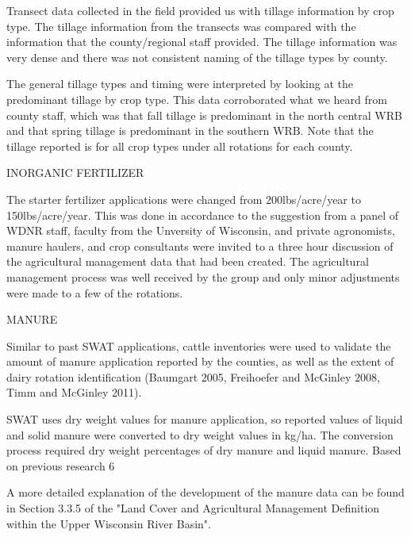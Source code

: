 Transect data collected in the field provided us with tillage information by crop type. The tillage information from the transects was compared with the information that the county/regional staff provided. The tillage information was very dense and there was not consistent naming of the tillage types by county.

The general tillage types and timing were interpreted by looking at the predominant tillage by
crop type. This data corroborated what we heard from county staff, which was that
fall tillage is predominant in the north central WRB and that spring tillage is predominant in the
southern WRB. Note that the tillage reported is for all crop types under all rotations for each county. 

INORGANIC FERTILIZER

The starter fertilizer applications were changed from 200lbs/acre/year to 150lbs/acre/year. This was done in accordance to the suggestion from a panel of WDNR staff, faculty from the Unversity of Wisconsin, and private agronomists, manure haulers, and crop consultants were invited to a three hour discussion of the agricultural management data that had been created. The agricultural management process was well received by the group and only minor adjustments were made to a few of the rotations.

MANURE

Similar to past SWAT applications, cattle inventories were used to validate the amount of manure application reported by the counties, as well as the extent of dairy rotation identification (Baumgart 2005, Freihoefer and McGinley 2008, Timm and McGinley 2011).

SWAT uses dry weight values for manure application, so reported values of liquid and solid manure were converted to dry weight values in kg/ha. The conversion process required dry weight percentages of dry manure and liquid manure. Based on previous research 6%

A more detailed explanation of the development of the manure data can be found in Section 3.3.5 of the "Land Cover and Agricultural Management Definition within the Upper Wisconsin River Basin".
